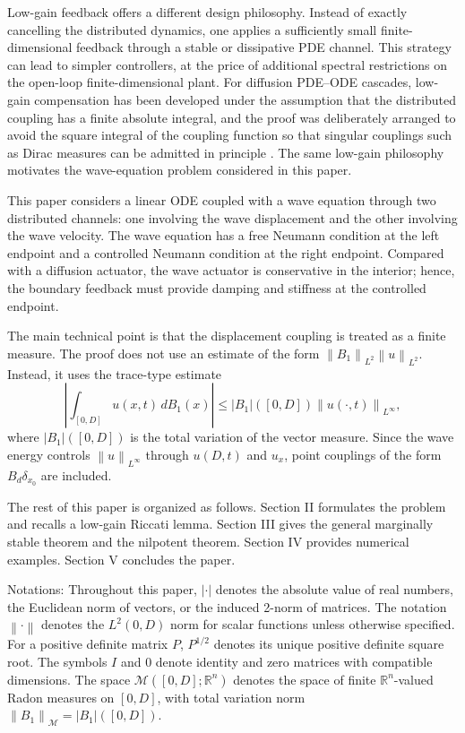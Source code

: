 \documentclass[journal]{IEEEtran}
\newcommand{\R}{\mathbb R}
\newcommand{\Mcal}{\mathcal M}
\newcommand{\norm}[1]{\left\|#1\right\|}
\newcommand{\abs}[1]{\left|#1\right|}
\begin{document}
Low-gain feedback offers a different design philosophy. Instead of exactly cancelling the distributed dynamics, one applies a sufficiently small finite-dimensional feedback through a stable or dissipative PDE channel. This strategy can lead to simpler controllers, at the price of additional spectral restrictions on the open-loop finite-dimensional plant. For diffusion PDE--ODE cascades, low-gain compensation has been developed under the assumption that the distributed coupling has a finite absolute integral, and the proof was deliberately arranged to avoid the square integral of the coupling function so that singular couplings such as Dirac measures can be admitted in principle \cite{XuLiuKrsticFeng2023}. The same low-gain philosophy motivates the wave-equation problem considered in this paper.

This paper considers a linear ODE coupled with a wave equation through two distributed channels: one involving the wave displacement and the other involving the wave velocity. The wave equation has a free Neumann condition at the left endpoint and a controlled Neumann condition at the right endpoint. Compared with a diffusion actuator, the wave actuator is conservative in the interior; hence, the boundary feedback must provide damping and stiffness at the controlled endpoint.

The main technical point is that the displacement coupling is treated as a finite measure. The proof does not use an estimate of the form $\norm{B_1}_{L^2}\norm{u}_{L^2}$. Instead, it uses the trace-type estimate
\begin{equation}
 \left|\int_{[0,D]} u(x,t)\,dB_1(x)\right|
 \le |B_1|([0,D])\norm{u(\cdot,t)}_{L^\infty},
\end{equation}
where $|B_1|([0,D])$ is the total variation of the vector measure. Since the wave energy controls $\norm{u}_{L^\infty}$ through $u(D,t)$ and $u_x$, point couplings of the form $B_d\delta_{x_0}$ are included.

The rest of this paper is organized as follows. Section II formulates the problem and recalls a low-gain Riccati lemma. Section III gives the general marginally stable theorem and the nilpotent theorem. Section IV provides numerical examples. Section V concludes the paper.

Notations: Throughout this paper, $\abs{\cdot}$ denotes the absolute value of real numbers, the Euclidean norm of vectors, or the induced 2-norm of matrices. The notation $\norm{\cdot}$ denotes the $L^2(0,D)$ norm for scalar functions unless otherwise specified. For a positive definite matrix $P$, $P^{1/2}$ denotes its unique positive definite square root. The symbols $I$ and $0$ denote identity and zero matrices with compatible dimensions. The space $\Mcal([0,D];\R^n)$ denotes the space of finite $\R^n$-valued Radon measures on $[0,D]$, with total variation norm $\norm{B_1}_{\Mcal}=|B_1|([0,D])$.
\end{document}
